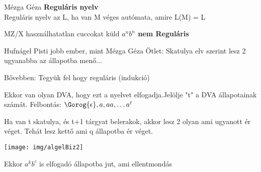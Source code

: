 \begin{definicio}{Mézga Géza}
  \textbf{Reguláris nyelv} \\[3pt]
  Reguláris nyelv az L, ha van M véges autómata, amire L(M) = L \\[0pt]
\end{definicio}

  \begin{tetel}{MZ/X használhatatlan cuccokat küld}
   \textbf{$a^n b^n$ nem Reguláris} \\[3pt]
   \end{tetel}

\begin{bizonyitas}{Hufnágel Pisti jobb ember, mint Mézga Géza}
 Ötlet: Skatulya elv szerint lesz 2 ugyanabba az állapotba menő...

  Bővebben: Tegyük fel hogy reguláris (indukció)

  Ekkor van olyan DVA, hogy ezt a nyelvet elfogadja.Jelölje "t" a DVA állapotainak számát. Felbontás: $\Gorog{\epsilon} , a, aa,\ldots a^t$

  Ha van t skatulya, és t+1 tárgyat belerakok, akkor lesz 2 olyan ami ugyanott ér véget. Tehát lesz kettő ami q állapotba ér véget.

  \begin{center}
  	 \texttt{[image: img/algelBiz2]}
  \end{center}
  Ekkor $a^kb^c$ is elfogadó állapotba jut, ami ellentmondás
\end{bizonyitas}
